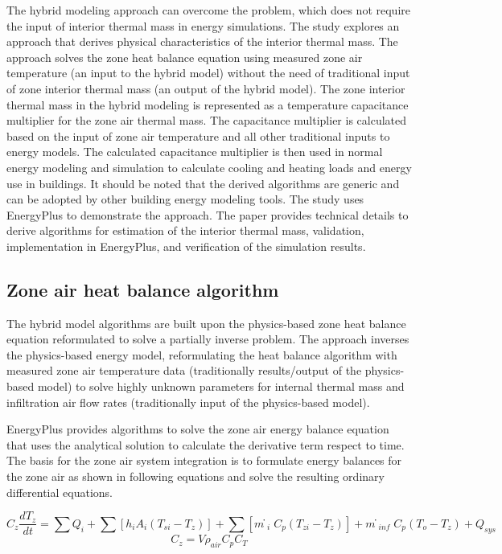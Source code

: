 The hybrid modeling approach can overcome the problem, which does not require the input of interior thermal mass in energy simulations. The study explores an approach that derives physical characteristics of the interior thermal mass. The approach solves the zone heat balance equation using measured zone air temperature (an input to the hybrid model) without the need of traditional input of zone interior thermal mass (an output of the hybrid model). The zone interior thermal mass in the hybrid modeling is represented as a temperature capacitance multiplier for the zone air thermal mass. The capacitance multiplier is calculated based on the input of zone air temperature and all other traditional inputs to energy models. The calculated capacitance multiplier is then used in normal energy modeling and simulation to calculate cooling and heating loads and energy use in buildings. It should be noted that the derived algorithms are generic and can be adopted by other building energy modeling tools. The study uses EnergyPlus to demonstrate the approach. The paper provides technical details to derive algorithms for estimation of the interior thermal mass, validation, implementation in EnergyPlus, and verification of the simulation results.

\subsection{Zone air heat balance algorithm}\label{Zone-air-heat-balance-algorithm}

The hybrid model algorithms are built upon the physics-based zone heat balance equation reformulated to solve a partially inverse problem. The approach inverses the physics-based energy model, reformulating the heat balance algorithm with measured zone air temperature data (traditionally results/output of the physics-based model) to solve highly unknown parameters for internal thermal mass and infiltration air flow rates (traditionally input of the physics-based model).

EnergyPlus provides algorithms to solve the zone air energy balance equation that uses the analytical solution to calculate the derivative term respect to time. The basis for the zone air system integration is to formulate energy balances for the zone air as shown in following equations and solve the resulting ordinary differential equations. 

\begin{equation}
C_z \frac {dT_z} {dt} = ∑Q_i +∑[h_i A_i (T_{si} - T_z)] + ∑[ṁ_i C_p (T_{zi}-T_z)] + ṁ_{inf} C_p (T_o - T_z) + Q_{sys}
\end{equation}
\begin{equation}
C_z = V ρ_{air} C_p C_T
\end{equation}

